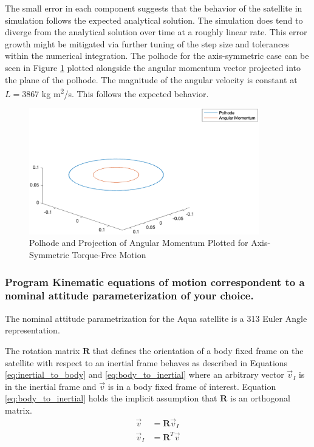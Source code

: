 The small error in each component suggests that the behavior of the satellite in simulation follows the expected analytical solution. The simulation does tend to diverge from the analytical solution over time at a roughly linear rate. This error growth might be mitigated via further tuning of the step size and tolerances within the numerical integration. The polhode for the axis-symmetric case can be seen in Figure \ref{fig:axis_symmetric_polhode} plotted alongside the angular momentum vector projected into the plane of the polhode. The magnitude of the angular velocity is constant at $L = 3867$ kg m\textsuperscript{2}/s. This follows the expected behavior.

\begin{figure}[H]
    \centering
    \captionsetup{justification = centering}
    \includegraphics[width = 10cm]{Images/axis_symmetric_polhode.png}
    \caption{Polhode and Projection of Angular Momentum Plotted for Axis-Symmetric Torque-Free Motion}
    \label{fig:axis_symmetric_polhode}
\end{figure}

\subsubsection{Program Kinematic equations of motion correspondent to a nominal attitude parameterization of your choice.}

The nominal attitude parametrization for the Aqua satellite is a 313 Euler Angle representation. 

The rotation matrix $\boldsymbol{R}$ that defines the orientation of a body fixed frame on the satellite with respect to an inertial frame behaves as described in Equations \ref{eq:inertial_to_body} and \ref{eq:body_to_inertial} where an arbitrary vector $\vec{v}_I$ is in the inertial frame and $\vec{v}$ is in a body fixed frame of interest. Equation \ref{eq:body_to_inertial} holds the implicit assumption that $\boldsymbol{R}$ is an orthogonal matrix. 
\begin{eqnarray}
    \vec{v} &= \boldsymbol{R} \vec{v}_I \label{eq:inertial_to_body} \\
    \vec{v}_I &= \boldsymbol{R}^T \vec{v} \label{eq:body_to_inertial}
\end{eqnarray}

